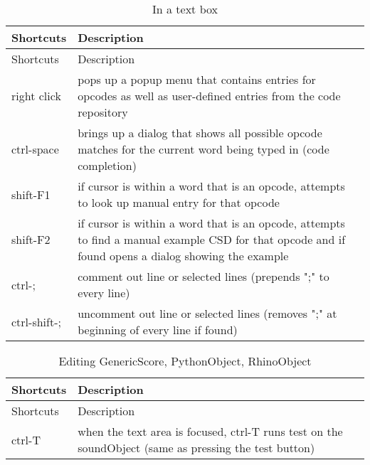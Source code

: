 \begin{longtable}[]{@{}ll@{}}
\caption{In a text box}\tabularnewline
\toprule
Shortcuts & Description\tabularnewline
\midrule
\endfirsthead
\toprule
Shortcuts & Description\tabularnewline
\midrule
\endhead
right click & pops up a popup menu that contains entries for opcodes as
well as user-defined entries from the code repository\tabularnewline
ctrl-space & brings up a dialog that shows all possible opcode matches
for the current word being typed in (code completion)\tabularnewline
shift-F1 & if cursor is within a word that is an opcode, attempts to
look up manual entry for that opcode\tabularnewline
shift-F2 & if cursor is within a word that is an opcode, attempts to
find a manual example CSD for that opcode and if found opens a dialog
showing the example\tabularnewline
ctrl-; & comment out line or selected lines (prepends ";" to every
line)\tabularnewline
ctrl-shift-; & uncomment out line or selected lines (removes ";" at
beginning of every line if found)\tabularnewline
\bottomrule
\end{longtable}

\begin{longtable}[]{@{}ll@{}}
\caption{Editing GenericScore, PythonObject, RhinoObject}\tabularnewline
\toprule
Shortcuts & Description\tabularnewline
\midrule
\endfirsthead
\toprule
Shortcuts & Description\tabularnewline
\midrule
\endhead
ctrl-T & when the text area is focused, ctrl-T runs test on the
soundObject (same as pressing the test button)\tabularnewline
\bottomrule
\end{longtable}
